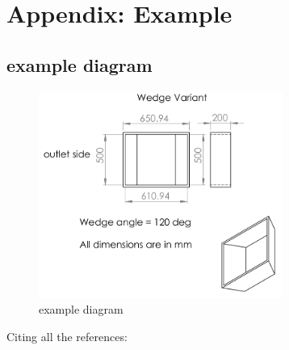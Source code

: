 \documentclass[sprache=english,doktyp=marbeit,fontsize=12pt]{TUBAFarbeiten}
\newcommand{\nocontentsline}[3]{}
\newcommand{\tocless}[2]{\bgroup\let\addcontentsline=\nocontentsline#1{#2}\egroup}
\begin{document}

\pagebreak
\printbibliography[heading=bibintoc]
\pagebreak
\appendix

\section{Appendix: Example}
\tocless\subsection{example diagram}

\begin{figure}[h!]
	\centering
	\includegraphics[width=80mm,scale=0.9]{w}
	\caption{example diagram}
	\label{fig:label10}
\end{figure}

Citing all the references: \cite{cite:1} \cite{cite:2} \cite{cite:3} \cite{cite:4} \cite{cite:5} \cite{cite:6} \cite{cite:7} \cite{cite:8} \cite{cite:9} \cite{cite:10} \cite{cite:11} \cite{cite:12} \cite{cite:13} \cite{cite:14} \cite{cite:15} \cite{cite:16} \cite{cite:17} \cite{cite:18} \cite{cite:19} \cite{cite:20} \cite{cite:21} \cite{cite:22} \cite{cite:23} \cite{cite:24} \cite{cite:25} \cite{cite:26} \cite{cite:27} \cite{cite:28} \cite{cite:29}
\end{document}
